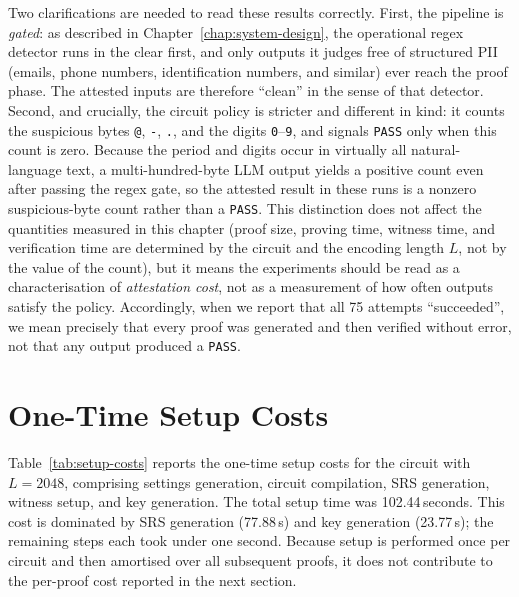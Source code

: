 \medskip

Two clarifications are needed to read these results correctly. First, the pipeline is \emph{gated}: as described in Chapter~\ref{chap:system-design}, the operational regex detector runs in the clear first, and only outputs it judges free of structured PII (emails, phone numbers, identification numbers, and similar) ever reach the proof phase. The attested inputs are therefore ``clean'' in the sense of that detector. Second, and crucially, the circuit policy is stricter and different in kind: it counts the suspicious bytes \texttt{@}, \texttt{-}, \texttt{.}, and the digits \texttt{0}--\texttt{9}, and signals \texttt{PASS} only when this count is zero. Because the period and digits occur in virtually all natural-language text, a multi-hundred-byte LLM output yields a positive count even after passing the regex gate, so the attested result in these runs is a nonzero suspicious-byte count rather than a \texttt{PASS}. This distinction does not affect the quantities measured in this chapter (proof size, proving time, witness time, and verification time are determined by the circuit and the encoding length $L$, not by the value of the count), but it means the experiments should be read as a characterisation of \emph{attestation cost}, not as a measurement of how often outputs satisfy the policy. Accordingly, when we report that all 75 attempts ``succeeded'', we mean precisely that every proof was generated and then verified without error, not that any output produced a \texttt{PASS}.

\section{One-Time Setup Costs}
\label{sec:eval-setup-costs}

Table~\ref{tab:setup-costs} reports the one-time setup costs for the circuit with $L = 2048$, comprising settings generation, circuit compilation, SRS generation, witness setup, and key generation. The total setup time was 102.44\,seconds. This cost is dominated by SRS generation (77.88\,s) and key generation (23.77\,s); the remaining steps each took under one second. Because setup is performed once per circuit and then amortised over all subsequent proofs, it does not contribute to the per-proof cost reported in the next section.

